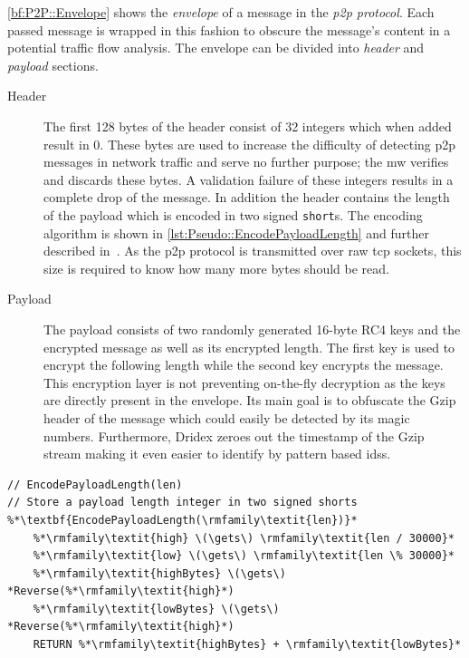 \autoref{bf:P2P::Envelope} shows the \emph{envelope} of a message in the \emph{\gls{p2p} protocol}.
Each passed message is wrapped in this fashion to obscure the message's content in a potential traffic flow analysis.
The envelope can be divided into \emph{header} and \emph{payload} sections.
\begin{description}
    \item[Header] The first 128 bytes of the header consist of 32 integers which when added result in 0.
    These bytes are used to increase the difficulty of detecting \gls{p2p} messages in network traffic and serve no further purpose; the \gls{mw} verifies and discards these bytes.
    A validation failure of these integers results in a complete drop of the message.
    In addition the header contains the length of the payload which is encoded in two signed \lstinline|short|s.
    The encoding algorithm is shown in \autoref{lst:Pseudo::EncodePayloadLength} and further described in~\cite[p.~9-10]{anubisnetworks2015dridex}.
    As the \gls{p2p} protocol is transmitted over raw \gls{tcp} sockets, this size is required to know how many more bytes should be read.
    \item[Payload] The payload consists of two randomly generated 16-byte RC4 keys and the encrypted message as well as its encrypted length.
    The first key is used to encrypt the following length while the second key encrypts the message.
    This encryption layer is not preventing on-the-fly decryption as the keys are directly present in the envelope.
    Its main goal is to obfuscate the Gzip header of the message which could easily be detected by its magic numbers.
    Furthermore, Dridex zeroes out the timestamp of the Gzip stream making it even easier to identify by pattern based \glspl{ids}.
\end{description}
\vspace{1em}

\begin{lstlisting}[style=pseudo, caption={Payload length encoding}, label={lst:Pseudo::EncodePayloadLength}]
// EncodePayloadLength(len)
// Store a payload length integer in two signed shorts
%*\textbf{EncodePayloadLength(\rmfamily\textit{len})}*
    %*\rmfamily\textit{high} \(\gets\) \rmfamily\textit{len / 30000}*
    %*\rmfamily\textit{low} \(\gets\) \rmfamily\textit{len \% 30000}*
    %*\rmfamily\textit{highBytes} \(\gets\) *Reverse(%*\rmfamily\textit{high}*)
    %*\rmfamily\textit{lowBytes} \(\gets\) *Reverse(%*\rmfamily\textit{high}*)
    RETURN %*\rmfamily\textit{highBytes} + \rmfamily\textit{lowBytes}*
\end{lstlisting}

